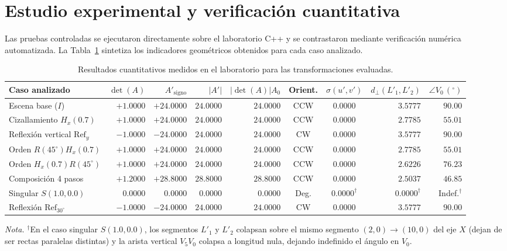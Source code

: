 \documentclass[a4paper,10pt]{article}
\newcommand{\notadocumental}[1]{\par\vspace{2pt}\footnotesize\textit{Nota.} #1\par}
\begin{document}
\section{Estudio experimental y verificación cuantitativa}

Las pruebas controladas se ejecutaron directamente sobre el laboratorio C++ y se contrastaron mediante verificación numérica automatizada. La Tabla~\ref{tab:resumen} sintetiza los indicadores geométricos obtenidos para cada caso analizado.

\begin{table}[H]
\caption{Resultados cuantitativos medidos en el laboratorio para las transformaciones evaluadas.}
\label{tab:resumen}
\centering
\scriptsize
\renewcommand{\arraystretch}{1.15}
\begin{tabular}{@{}l r r r r c c r r@{}}
\toprule
Caso analizado & $\det(A)$ & $A'_{\text{signo}}$ & $|A'|$ & $|\det(A)|A_0$ & Orient. & $\sigma(u',v')$ & $d_\perp(L'_1,L'_2)$ & $\angle V_0\,(^\circ)$ \\
\midrule
Escena base ($I$) & $+1.0000$ & $+24.0000$ & $24.0000$ & $24.0000$ & CCW & $0.0000$ & $3.5777$ & $90.00$ \\
Cizallamiento $H_x(0.7)$ & $+1.0000$ & $+24.0000$ & $24.0000$ & $24.0000$ & CCW & $0.0000$ & $2.7785$ & $55.01$ \\
Reflexión vertical $\mathrm{Ref}_y$ & $-1.0000$ & $-24.0000$ & $24.0000$ & $24.0000$ & CW & $0.0000$ & $3.5777$ & $90.00$ \\
Orden $R(45^\circ)H_x(0.7)$ & $+1.0000$ & $+24.0000$ & $24.0000$ & $24.0000$ & CCW & $0.0000$ & $2.7785$ & $55.01$ \\
Orden $H_x(0.7)R(45^\circ)$ & $+1.0000$ & $+24.0000$ & $24.0000$ & $24.0000$ & CCW & $0.0000$ & $2.6226$ & $76.23$ \\
Composición 4 pasos & $+1.2000$ & $+28.8000$ & $28.8000$ & $28.8000$ & CCW & $0.0000$ & $2.5037$ & $46.85$ \\
Singular $S(1.0, 0.0)$ & $0.0000$ & $0.0000$ & $0.0000$ & $0.0000$ & Deg. & $0.0000^\dagger$ & $0.0000^\dagger$ & Indef.$^\dagger$ \\
Reflexión $\mathrm{Ref}_{30^\circ}$ & $-1.0000$ & $-24.0000$ & $24.0000$ & $24.0000$ & CW & $0.0000$ & $3.5777$ & $90.00$ \\
\bottomrule
\end{tabular}
\notadocumental{$^\dagger$En el caso singular $S(1.0, 0.0)$, los segmentos $L'_1$ y $L'_2$ colapsan sobre el mismo segmento $(2,0)\to(10,0)$ del eje $X$ (dejan de ser rectas paralelas distintas) y la arista vertical $V_5V_0$ colapsa a longitud nula, dejando indefinido el ángulo en $V_0$.}
\end{table}
\end{document}
